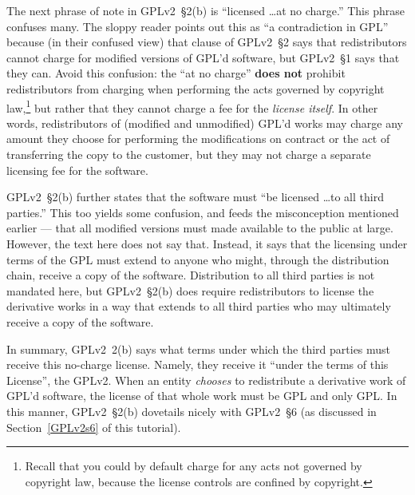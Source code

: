 \medskip

\label{GPLv2s2-at-no-charge}
The next phrase of note in GPLv2~\S2(b) is ``licensed \ldots at no charge.''
This phrase  confuses many.  The sloppy reader points out this as ``a
contradiction in GPL'' because (in their confused view) that clause of GPLv2~\S2 says that redistributors cannot
charge for modified versions of GPL'd software, but GPLv2~\S1 says that
they can.  Avoid this confusion: the ``at no charge'' \textbf{does not} prohibit redistributors from
charging when performing the acts governed by copyright
law,\footnote{Recall that you could by default charge for any acts not
governed by copyright law, because the license controls are confined
by copyright.} but rather that they cannot charge a fee for the
\emph{license itself}.  In other words, redistributors of (modified
and unmodified) GPL'd works may charge any amount they choose for
performing the modifications on contract or the act of transferring
the copy to the customer, but they may not charge a separate licensing
fee for the software.

GPLv2~\S2(b) further states that the software must ``be licensed \ldots to all
third parties.''  This too yields some confusion, and feeds the
misconception mentioned earlier --- that all modified versions must made
available to the public at large.  However, the text here does not say
that.  Instead, it says that the licensing under terms of the GPL must
extend to anyone who might, through the distribution chain, receive a copy
of the software.  Distribution to all third parties is not mandated here,
but GPLv2~\S2(b) does require redistributors to license the derivative works in
a way that extends to all third parties who may ultimately receive a
copy of the software.

In summary, GPLv2\ 2(b) says what terms under which the third parties must
receive this no-charge license.  Namely, they receive it ``under the terms
of this License'', the GPLv2.  When an entity \emph{chooses} to redistribute
a derivative work of GPL'd software, the license of that whole 
work must be GPL and only GPL\@.  In this manner, GPLv2~\S2(b) dovetails nicely
with GPLv2~\S6 (as discussed in Section~\ref{GPLv2s6} of this tutorial).

\medskip

